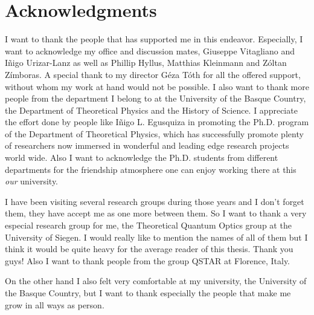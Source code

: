 \documentclass[12pt, letterpaper, twoside]{article}
\numberwithin{equation}{section}
\numberwithin{figure}{section}
\numberwithin{table}{section}
\begin{document}
\cleardoublepage

\section*{Acknowledgments}

I want to thank the people that has supported me in this endeavor.
Especially, I want to acknowledge my office and discussion mates, Giuseppe Vitagliano and I\~nigo Urizar-Lanz as well as Phillip Hyllus, Matthias Kleinmann and Z\'oltan Z\'imboras.
A special thank to my director G\'eza T\'oth for all the offered support, without whom my work at hand would not be possible.
I also want to thank more people from the department I belong to at the University of the Basque Country, the Department of Theoretical Physics and the History of Science.
I appreciate the effort done by people like I\~nigo L. Egusquiza in promoting the Ph.D. program of the Department of Theoretical Physics, which has successfully promote plenty of researchers now immersed in wonderful and leading edge research projects world wide.
Also I want to acknowledge the Ph.D. students from different departments for the friendship atmosphere one can enjoy working there at this \emph{our} university.

I have been visiting several research groups during those years and I don't forget them, they have accept me as one more between them.
So I want to thank a very especial research group for me, the Theoretical Quantum Optics group at the University of Siegen.
I would really like to mention the names of all of them but I think it would be quite heavy for the average reader of this thesis.
Thank you guys!
Also I want to thank people from the group QSTAR at Florence, Italy.

On the other hand I also felt very comfortable at my university, the University of the Basque Country, but I want to thank especially the people that make me grow in all ways as person.

\cleardoublepage


\renewcommand{\headrulewidth}{0.5pt}
\fancyfoot[LE,RO]{\thepage}
\fancyhead[LE]{\rightmark}
\fancyhead[RO]{\leftmark}









\end{document}
